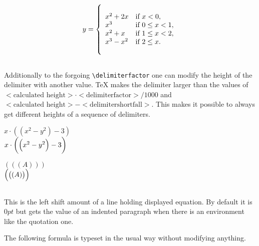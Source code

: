\begin{table}[htb]
\begin{LTXexample}[width=0.4\linewidth]
\[
\delimiterfactor=1500
y = \left\{%
 \begin{array}{ll}
   x^2+2x  &\textrm{if }x<0,\\
   x^3     &\textrm{if }0\le x<1,\\
   x^2+x   &\textrm{if }1\le x<2,\\
   x^3-x^2 &\textrm{if }2\le x.
 \end{array}%
\right.
\]
\end{LTXexample}

\subsection{}
Additionally to the forgoing \verb+\delimiterfactor+ one can modify the height of the
delimiter with another value. \TeX{} makes the delimiter larger than the values of
$<\textrm{calculated height}>\cdot <\textrm{delimiterfactor}>/1000$ and $<\textrm{calculated height}>-<\textrm{delimitershortfall}>$. This makes it possible to always get different heights    %
of a sequence of delimiters. 

\begin{LTXexample}[width=0.3\linewidth]
$x\cdot\left(\left(x^2-y^2\right)-3\right)$\\[7pt]

$
\delimitershortfall-1pt
x\cdot\left(\left(x^2-y^2\right)-3\right)$
\end{LTXexample}

\begin{LTXexample}[width=0.2\linewidth]
$\left(\left(\left(A\right)\right)\right)$\\[7pt]

$\delimitershortfall-1pt
\left(\left(\left(A\right)\right)\right)$
\end{LTXexample}


\subsection{}
This is the left shift amount of a line holding displayed equation. 
By default it is $0pt$ but
gets the value of an indented paragraph when there is an environment like the quotation one.

The following formula is typeset in the usual way without modifying anything.


\end{table}
